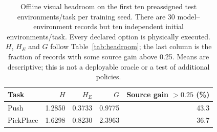 \begin{table}[tb]\centering\small
\caption{Offline visual headroom on the first ten preassigned test environments/task per training seed. There are 30 model--environment records but ten independent initial environments/task. Every declared option is physically executed. $H$, $H_E$ and $G$ follow Table~\ref{tab:headroom}; the last column is the fraction of records with some source gain above 0.25. Means are descriptive; this is not a deployable oracle or a test of additional policies.}\label{tab:visualoracle}
\begin{tabular}{lrrrr}\toprule Task & $H$ & $H_E$ & $G$ & Source gain $>0.25$ (\%)\\\midrule
Push & 1.2850 & 0.3733 & 0.9775 & 43.3\\
PickPlace & 1.6298 & 0.8230 & 2.3963 & 36.7\\
\bottomrule\end{tabular}\end{table}
